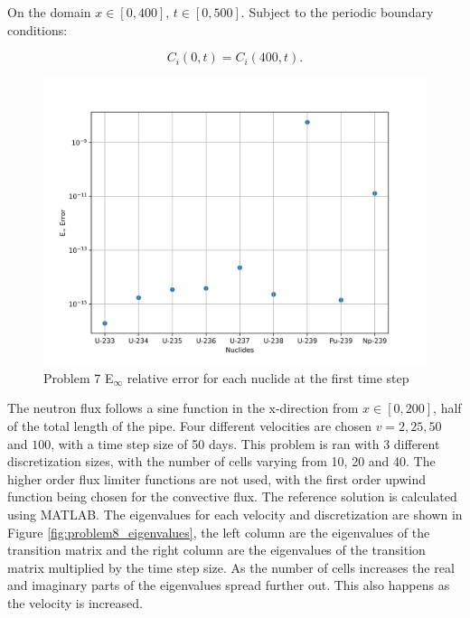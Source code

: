 \noindent On the domain $x \in [0, 400]$, $t \in [0, 500]$. Subject to the periodic boundary conditions:

\begin{equation}
    C_{i}(0,t) = C_{i}(400,t).
\end{equation}

\clearpage

\begin{figure}[p]
    \centering
    \includegraphics[width=6in]{images/chapter-5/progressionProblems/problem7/problem7NuclideErrorFirstStep.png}
    \caption{Problem 7 E${}_{\infty}$ relative error for each nuclide at the first time step}
    \label{fig:problem7_nuclide_relative_error}
\end{figure}

\clearpage

\noindent The neutron flux follows a sine function in the x-direction from $x \in [0, 200]$, half of the total length of the pipe. Four different velocities are chosen $ v = 2, 25, 50 $ and $100$, with a time step size of 50 days. This problem is ran with 3 different discretization sizes, with the number of cells varying from 10, 20 and 40. The higher order flux limiter functions are not used, with the first order upwind function being chosen for the convective flux. The reference solution is calculated using MATLAB. The eigenvalues for each velocity and discretization are shown in Figure \ref{fig:problem8_eigenvalues}, the left column are the eigenvalues of the transition matrix and the right column are the eigenvalues of the transition matrix multiplied by the time step size. As the number of cells increases the real and imaginary parts of the eigenvalues spread further out. This also happens as the velocity is increased. 



